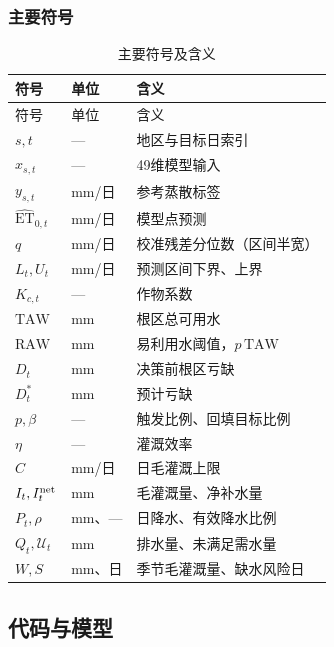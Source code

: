 \subsubsection{主要符号}
\begin{longtable}{@{}p{.19\linewidth}p{.19\linewidth}p{.54\linewidth}@{}}
\caption{主要符号及含义}\label{tab:symbols}\\\toprule
符号 & 单位 & 含义\\\midrule\endfirsthead
\toprule 符号 & 单位 & 含义\\\midrule\endhead
$s,t$ & — & 地区与目标日索引\\
$x_{s,t}$ & — & 49维模型输入\\
$y_{s,t}$ & mm/日 & 参考蒸散标签\\
$\widehat{\mathrm{ET}}_{0,t}$ & mm/日 & 模型点预测\\
$q$ & mm/日 & 校准残差分位数（区间半宽）\\
$L_t,U_t$ & mm/日 & 预测区间下界、上界\\
$K_{c,t}$ & — & 作物系数\\
$\mathrm{TAW}$ & mm & 根区总可用水\\
$\mathrm{RAW}$ & mm & 易利用水阈值，$p\,\mathrm{TAW}$\\
$D_t$ & mm & 决策前根区亏缺\\
$D_t^*$ & mm & 预计亏缺\\
$p,\beta$ & — & 触发比例、回填目标比例\\
$\eta$ & — & 灌溉效率\\
$C$ & mm/日 & 日毛灌溉上限\\
$I_t,I_t^{\rm net}$ & mm & 毛灌溉量、净补水量\\
$P_t,\rho$ & mm、— & 日降水、有效降水比例\\
$Q_t,\mathcal U_t$ & mm & 排水量、未满足需水量\\
$W,S$ & mm、日 & 季节毛灌溉量、缺水风险日\\\bottomrule
\end{longtable}

\subsection{代码与模型}
